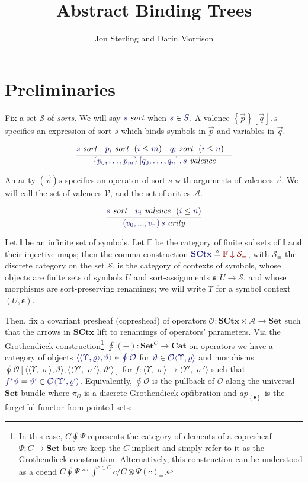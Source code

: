 \documentclass[11pt]{article}
\theoremstyle{definition}
\theoremstyle{remark}
\numberwithin{equation}{section}
\def\IModeColorName{MidnightBlue}
\def\OModeColorName{Maroon}
\newcommand\IMode[1]{{\color{\IModeColorName}{#1}}}
\newcommand\OMode[1]{{\color{\OModeColorName}{#1}}}
\newcommand\HypJ[2]{#1\ \ (#2)}
\newcommand\MkSet[1]{\left\{#1\right\}}
\newcommand\Member[2]{\IMode{#1}\in\IMode{#2}}
\newcommand\EqMember[3]{\IMode{#1}=\IMode{#2}\in\IMode{#3}}
\newcommand\MkValence[3]{\left\{#1\right\}\left[#2\right].\, #3}
\newcommand\MkArity[2]{\left(#1\right) #2}
\newcommand\IsArity[1]{\IMode{#1}\ \textit{arity}}
\newcommand\IsValence[1]{\IMode{#1}\ \textit{valence}}
\newcommand\IsSort[1]{\IMode{#1}\ \textit{sort}}
\newcommand\Leq[2]{\IMode{#1}\leq\IMode{#2}}
\newcommand\Symbols{\mathbb{I}}
\newcommand\Finsets{\mathbb{F}}
\newcommand\Sorts{\mathcal{S}}
\newcommand\Valences{\mathcal{V}}
\newcommand\Arities{\mathcal{A}}
\newcommand\Operators{\mathcal{O}}
\newcommand\Cats{\mathbf{Cat}}
\newcommand\Discrete[1]{#1_{\equiv}}
\newcommand\Sets{\mathbf{Set}}
\newcommand\SCtx{\mathbf{SCtx}}
\newcommand\Grothendieck[2]{\oint^{#1} #2#1}
\newcommand\Pair[2]{\langle #1, #2 \rangle}
\newcommand\Restriction[1]{#1^{*}}
\newcommand\Singleton{\MkSet{\bullet}}
\newcommand\Comma[2]{#1 \downarrow #2}
\newcommand\Hom[3]{#1\left[#2,#3\right]}
\newcommand\Define[2]{\IMode{#1}\triangleq\OMode{#2}}
\begin{document}
\title{Abstract Binding Trees}
\date{}
\author{Jon Sterling and Darin Morrison}
\maketitle

\section{Preliminaries}

Fix a set $\Sorts$ of \emph{sorts}. We will say $\IsSort{s}$ when
$\Member{s}{S}$. A valence $\MkValence{\vec{p}}{\vec{q}}{s}$ specifies an
expression of sort $s$ which binds symbols in $\vec{p}$ and variables in
$\vec{q}$.

\[
  \infer{
    \IsValence{\MkValence{p_0,\dots,p_m}{q_0,\dots,q_n}{s}}
  }{
    \IsSort{s} &
    \HypJ{\IsSort{p_i}}{\Leq{i}{m}} &
    \HypJ{\IsSort{q_i}}{\Leq{i}{n}} &
  }
\]

An arity $\MkArity{\vec{v}}{s}$ specifies an operator of sort $s$ with
arguments of valences $\vec{v}$. We will call the set of valences $\Valences$,
and the set of arities $\Arities$.

\[
  \infer{
    \IsArity{\MkArity{v_0,...,v_n}{s}}
  }{
    \IsSort{s} &
    \HypJ{\IsValence{v_i}}{\Leq{i}{n}}
  }
\]


Let $\Symbols$ be an infinite set of symbols. Let $\Finsets$ be the category of
finite subsets of $\Symbols$ and their injective maps; then the comma
construction $\Define{\SCtx}{\Comma{\Finsets}{\Discrete{\Sorts}}}$, with
$\Discrete{\Sorts}$ the discrete category on the set $\mathcal{S}$, is the
category of contexts of symbols, whose objects are finite sets of symbols $U$
and sort-assignments $\mathfrak{s}:U\to\Sorts$, and whose morphisms are
sort-preserving renamings; we will write $\Upsilon$ for a symbol context
$(U,\mathfrak{s})$.

Then, fix a covariant presheaf (copresheaf) of operators
$\Operators:\SCtx\times\Arities\to\Sets$ such that the arrows in $\SCtx$ lift to
renamings of operators' parameters. Via the Grothendieck
construction\footnote{In this case, $C\Grothendieck{}{\Psi}$ represents the
  category of elements of a copresheaf $\Psi : C\to\Sets$ but we keep the $C$
  implicit and simply refer to it as the Grothendieck construction.
  Alternatively, this construction can be understood as a coend
  $C\Grothendieck{}{\Psi} \cong \int^{c \in C}c / C \otimes
  \Discrete{\Psi(c)}$.} $\Grothendieck{}{(-)} : \Sets^{C}\to\Cats$ on operators
we have a category of objects
$\Member{\Pair{\Pair{\Upsilon}{\varrho}}{\vartheta}}{\Grothendieck{}{\Operators}}$
for $\Member{\vartheta}{\Operators\Pair{\Upsilon}{\varrho}}$ and morphisms
$\Hom{\Grothendieck{}{\Operators}}{\Pair{\Pair{\Upsilon}{\varrho}}{\vartheta}}{\Pair{\Pair{\Upsilon'}{\varrho'}}{\vartheta'}}$
for $f : \Pair{\Upsilon}{\varrho}\to\Pair{\Upsilon'}{\varrho'}$ such that
$\EqMember{\Restriction{f}\vartheta}{\vartheta'}{\Operators\Pair{\Upsilon'}{\varrho'}}$.
Equivalently, $\Grothendieck{}{\Operators}$ is the pullback of $\Operators$
along the universal $\Sets$-bundle where $\pi_{\Operators}$ is a discrete
Grothendieck opfibration and $ap_{\Singleton}$ is the forgetful functor from pointed sets:
\end{document}
